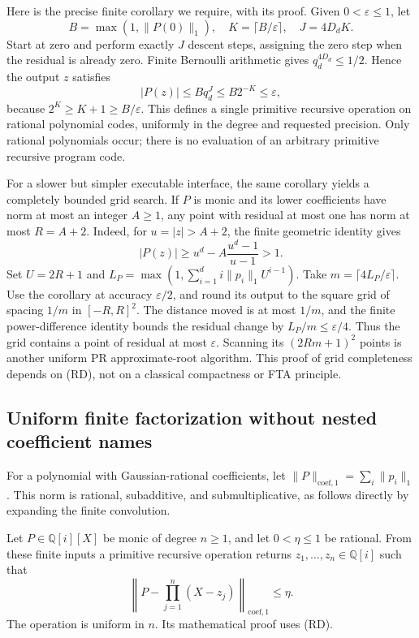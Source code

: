 Here is the precise finite corollary we require, with its proof. Given
\(0<\varepsilon\le1\), let
\[
 B=\max(1,\|P(0)\|_1),\quad
 K=\lceil B/\varepsilon\rceil,\quad J=4D_dK.
\]
Start at zero and perform exactly \(J\) descent steps, assigning the
zero step when the residual is already zero. Finite Bernoulli arithmetic
gives \(q_d^{4D_d}\le1/2\). Hence the output \(z\) satisfies
\[
 |P(z)|\le Bq_d^J\le B2^{-K}\le\varepsilon,
\]
because \(2^K\ge K+1\ge B/\varepsilon\). This defines a single
primitive recursive operation on rational polynomial codes, uniformly in
the degree and requested precision. Only rational polynomials occur;
there is no evaluation of an arbitrary primitive recursive program code.

For a slower but simpler executable interface, the same corollary yields
a completely bounded grid search. If \(P\) is monic and its lower
coefficients have norm at most an integer \(A\ge1\), any point with
residual at most one has norm at most \(R=A+2\). Indeed, for
\(u=|z|>A+2\), the finite geometric identity gives
\[
 |P(z)|\ge u^d-A\frac{u^d-1}{u-1}>1.
\]
Set \(U=2R+1\) and
\(L_P=\max(1,\sum_{i=1}^d i\|p_i\|_1U^{i-1})\).
Take \(m=\lceil4L_P/\varepsilon\rceil\). Use the corollary at accuracy
\(\varepsilon/2\), and round its output to the square grid of spacing
\(1/m\) in \([-R,R]^2\). The distance moved is at most \(1/m\), and
the finite power-difference identity bounds the residual change by
\(L_P/m\le\varepsilon/4\). Thus the grid contains a point of residual
at most \(\varepsilon\). Scanning its \((2Rm+1)^2\) points is another
uniform PR approximate-root algorithm. This proof of grid completeness
depends on (RD), not on a classical compactness or FTA principle.

\subsection{Uniform finite factorization without nested coefficient names}

For a polynomial with Gaussian-rational coefficients, let
\(\|P\|_{\mathrm{coef},1}=\sum_i\|p_i\|_1\).
This norm is rational, subadditive, and submultiplicative, as follows
directly by expanding the finite convolution.

\begin{theorem}
\label{thm:approx-factor}
Let \(P\in\mathbb Q[i][X]\) be monic of degree \(n\ge1\), and let
\(0<\eta\le1\) be rational. From these finite inputs a primitive
recursive operation returns \(z_1,\ldots,z_n\in\mathbb Q[i]\) such that
\[
 \left\|P-\prod_{j=1}^n(X-z_j)\right\|_{\mathrm{coef},1}\le\eta.
\]
The operation is uniform in \(n\). Its mathematical proof uses (RD).
\end{theorem}


